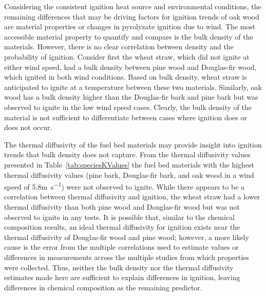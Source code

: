     Considering the consistent ignition heat source and environmental conditions, the remaining differences that may be driving factors for ignition trends of oak wood are material properties or changes in pyrolyzate ignition due to wind. The most accessible material property to quantify and compare is the bulk density of the materials. However, there is no clear correlation between density and the probability of ignition. Consider first the wheat straw, which did not ignite at either wind speed, had a bulk density between pine wood and Douglas-fir wood, which ignited in both wind conditions. Based on bulk density, wheat straw is anticipated to ignite at a temperature between these two materials. Similarly, oak wood has a bulk density higher than the Douglas-fir bark and pine bark but was observed to ignite in the low wind speed cases. Clearly, the bulk density of the material is not sufficient to differentiate between cases where ignition does or does not occur. 
    
    The thermal diffusivity of the fuel bed materials may provide insight into ignition trends that bulk density does not capture. From the thermal diffusivity values presented in Table~\ref{tab:speciesKValues} the fuel bed materials with the highest thermal diffusivity values (pine bark, Douglas-fir bark, and oak wood in a wind speed of 5.8\si{\meter\per\second}) were not observed to ignite. While there appears to be a correlation between thermal diffusivity and ignition, the wheat straw had a lower thermal diffusivity than both pine wood and Douglas-fir wood but was not observed to ignite in any tests. It is possible that, similar to the chemical composition results, an ideal thermal diffusivity for ignition exists near the thermal diffusivity of Douglas-fir wood and pine wood; however, a more likely cause is the error from the multiple correlations used to estimate values or differences in measurements across the multiple studies from which properties were collected. Thus, neither the bulk density nor the thermal diffusivity estimates made here are sufficient to explain differences in ignition, leaving differences in chemical composition as the remaining predictor.  
    
